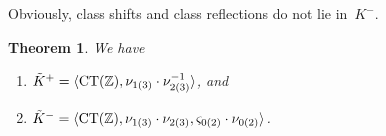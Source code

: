 \documentclass{amsart}
\theoremstyle{definition} \newtheorem{CTZDefinition}{Definition}[section]
\theoremstyle{plain}      \newtheorem{CTZPropertiesTheorem}[CTZDefinition]{Theorem}
\theoremstyle{plain}      \newtheorem{CTZSubgroupsTheorem}[CTZDefinition]{Theorem}
\theoremstyle{definition} \newtheorem{RcwaMappingDefinition}{Definition}[section]
\theoremstyle{definition} \newtheorem{RCWADefinition}[RcwaMappingDefinition]{Definition}
\theoremstyle{plain}      \newtheorem{CTZNotFinitelyGeneratedTheorem}
\theoremstyle{definition} \newtheorem{CTZSmEmbeddingDefinition}[RcwaMappingDefinition]{Definition}
\theoremstyle{plain}      \newtheorem{CTZHighlyTransitiveTheorem}[RcwaMappingDefinition]{Theorem}
\theoremstyle{plain}      \newtheorem{CTZTorsionElementsDivisibleTheorem}
\theoremstyle{plain}      \newtheorem{CTLemma}{Lemma}[section]
\theoremstyle{plain}      \newtheorem{IntegralCommutatorLemma}[CTLemma]{Lemma}
\theoremstyle{plain}      \newtheorem{NormalSubgroupContainsIntegralElementLemma}[CTLemma]{Lemma}
\theoremstyle{plain}      \newtheorem{CTZSimpleTheorem}[CTLemma]{Theorem}
\theoremstyle{remark}     \newtheorem{CTZSimpleRemark}[CTLemma]{Remark}
\theoremstyle{definition} \newtheorem{CTPZDefinition}[CTLemma]{Definition}
\theoremstyle{plain}      \newtheorem{CTPZSimpleCorollary}[CTLemma]{Corollary}
\theoremstyle{plain}      \newtheorem{CTPZSimpleProblem}[CTLemma]{Problem}
\theoremstyle{plain}      \newtheorem{FnPSL2ZEmbeddingTheorem}{Theorem}[section]
\theoremstyle{plain}      \newtheorem{FreeProductEmbeddingTheorem}[FnPSL2ZEmbeddingTheorem]{Theorem}
\theoremstyle{definition} \newtheorem{RestrictionMonomorphismDefinition}
\theoremstyle{plain}      \newtheorem{DirectAndWreathProductsEmbeddingTheorem}
\theoremstyle{plain}      \newtheorem{DirectAndWreathProductsEmbeddingCorollary}
\theoremstyle{definition} \newtheorem{CTintZDefinition}[FnPSL2ZEmbeddingTheorem]{Definition}
\theoremstyle{plain}      \newtheorem{CTintZSimpleTheorem}[FnPSL2ZEmbeddingTheorem]{Theorem}
\theoremstyle{definition} \newtheorem{KernelDefinition}{Definition}[section]
\theoremstyle{definition} \newtheorem{TameWildDefinition}[KernelDefinition]{Definition}
\theoremstyle{definition} \newtheorem{SimpleSupergroupsDefinition}[KernelDefinition]{Definition}
\theoremstyle{definition} \newtheorem{CSCRDefinition}[KernelDefinition]{Definition}
\theoremstyle{plain}      \newtheorem{SimpleSupergroupsGeneratorsTheorem}[KernelDefinition]{Theorem}
\theoremstyle{plain}      \newtheorem{SimpleSupergroupsTheorem}[KernelDefinition]{Theorem}
\theoremstyle{plain}      \newtheorem{SimpleSupergroupsTransitivityTheorem}
\theoremstyle{plain}      \newtheorem{TameGenerationConjecture}[KernelDefinition]{Conjecture}
\theoremstyle{remark}     \newtheorem{TameGenerationRemark}[KernelDefinition]{Remark}
\begin{document}
Obviously, class shifts and class reflections do not lie in~\(K^-\). 

\goodbreak

\begin{SimpleSupergroupsGeneratorsTheorem} \label{SimpleSupergroupsGeneratorsTheorem}
  We have
  \begin{enumerate}

    \item \(\ti{K}^+ = \langle \CT{\ZZ}, \nu_{1(3)} \cdot \nu_{2(3)}^{-1} \rangle\), and

    \item \(\ti{K}^- = \langle \CT{\ZZ}, \nu_{1(3)} \cdot \nu_{2(3)},
                                         \varsigma_{0(2)} \cdot \nu_{0(2)} \rangle\).
  \end{enumerate}
\end{SimpleSupergroupsGeneratorsTheorem}
\end{document}
